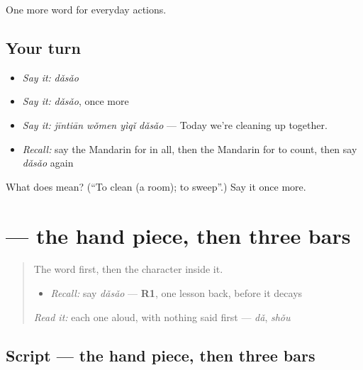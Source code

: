 \begin{grammarlens}[title={What you've built}]
One more word for everyday actions.
\end{grammarlens}

\subsection*{Your turn}
\begin{itemize}
\raggedright
  \item \emph{Say it:} \emph{dǎsǎo}
  \item \emph{Say it:} \emph{dǎsǎo}, once more
  \item \emph{Say it:} \emph{jīntiān wǒmen yìqǐ dǎsǎo} — Today we're cleaning up together.
  \item \emph{Recall:} say the Mandarin for in all, then the Mandarin for to count, then say \emph{dǎsǎo} again
\end{itemize}

\begin{tcolorbox}[breakable,colback=teal!4,colframe=teal!35!black,title={Before you move on}]
What does  mean? (\textquotedblleft{}To clean (a room); to sweep\textquotedblright{}.) Say it once more.
\end{tcolorbox}
\section[\texorpdfstring{\zh{扫} (sǎo)}{扫 (sǎo)}]{ — the hand piece, then three bars}

\label{lesson:ZH-W133-sao-sweep}



\begin{quote}
The word first, then the character inside it.

\begin{itemize}
\raggedright
  \item \emph{Recall:} say \emph{dǎsǎo} — \textbf{R1}, one lesson back, before it decays
\end{itemize}

\begin{quote}
 
\end{quote}

\emph{Read it:} each one aloud, with nothing said first — \emph{dǎ}, \emph{shǒu}
\end{quote}

\subsection*{Script — the hand piece, then three bars}

